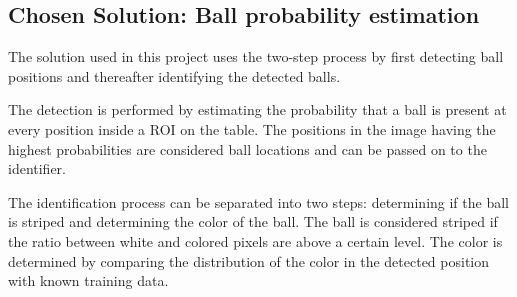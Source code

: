 \subsection{Chosen Solution: Ball probability estimation}
The solution used in this project uses the two-step process by first detecting ball positions and thereafter identifying the detected balls.

The detection is performed by estimating the probability that a ball is present at every position inside a ROI on the table. The positions in the image having the highest probabilities are considered ball locations and can be passed on to the identifier.

The identification process can be separated into two steps: determining if the ball is striped and determining the color of the ball. The ball is considered striped if the ratio between white and colored pixels are above a certain level. The color is determined by comparing the distribution of the color in the detected position with known training data.
